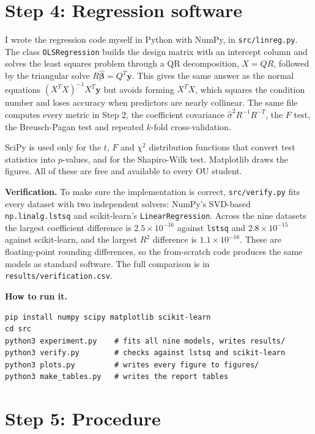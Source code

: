 \documentclass[11pt]{article}
\begin{document}
\section{Step 4: Regression software}

I wrote the regression code myself in Python with NumPy, in \texttt{src/linreg.py}. The class \texttt{OLSRegression} builds the design matrix with an intercept column and solves the least squares problem through a QR decomposition, $X = QR$, followed by the triangular solve $R\hat{\boldsymbol\beta} = Q^T\mathbf{y}$. This gives the same answer as the normal equations $(X^TX)^{-1}X^T\mathbf{y}$ but avoids forming $X^TX$, which squares the condition number and loses accuracy when predictors are nearly collinear. The same file computes every metric in Step 2, the coefficient covariance $\hat\sigma^2 R^{-1}R^{-T}$, the $F$ test, the Breusch-Pagan test and repeated $k$-fold cross-validation.

SciPy is used only for the $t$, $F$ and $\chi^2$ distribution functions that convert test statistics into $p$-values, and for the Shapiro-Wilk test. Matplotlib draws the figures. All of these are free and available to every OU student.

\textbf{Verification.} To make sure the implementation is correct, \texttt{src/verify.py} fits every dataset with two independent solvers: NumPy's SVD-based \texttt{np.linalg.lstsq} and scikit-learn's \texttt{LinearRegression}. Across the nine datasets the largest coefficient difference is $2.5\times10^{-16}$ against \texttt{lstsq} and $2.8\times10^{-15}$ against scikit-learn, and the largest $R^2$ difference is $1.1\times10^{-16}$. These are floating-point rounding differences, so the from-scratch code produces the same models as standard software. The full comparison is in \texttt{results/verification.csv}.

\textbf{How to run it.}
\begin{verbatim}
pip install numpy scipy matplotlib scikit-learn
cd src
python3 experiment.py    # fits all nine models, writes results/
python3 verify.py        # checks against lstsq and scikit-learn
python3 plots.py         # writes every figure to figures/
python3 make_tables.py   # writes the report tables
\end{verbatim}

\section{Step 5: Procedure}
\end{document}
